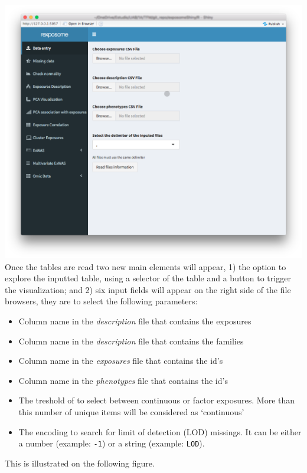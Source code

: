 \documentclass[
]{book}
\providecommand{\tightlist}{%
  \setlength{\itemsep}{0pt}\setlength{\parskip}{0pt}}
\begin{document}
\includegraphics{images/analysis1_2.png} Once the tables are read two new main elements will appear, 1) the option to explore the inputted table, using a selector of the table and a button to trigger the visualization; and 2) six input fields will appear on the right side of the file browsers, they are to select the following parameters:

\begin{itemize}
\tightlist
\item
  Column name in the \emph{description} file that contains the exposures
\item
  Column name in the \emph{description} file that contains the families\\
\item
  Column name in the \emph{exposures} file that contains the id's
\item
  Column name in the \emph{phenotypes} file that contains the id's
\item
  The treshold of to select between continuous or factor exposures. More than this number of unique items will be considered as `continuous'
\item
  The encoding to search for limit of detection (LOD) missings. It can be either a number (example: \texttt{-1}) or a string (example: \texttt{LOD}).
\end{itemize}

This is illustrated on the following figure.
\end{document}
